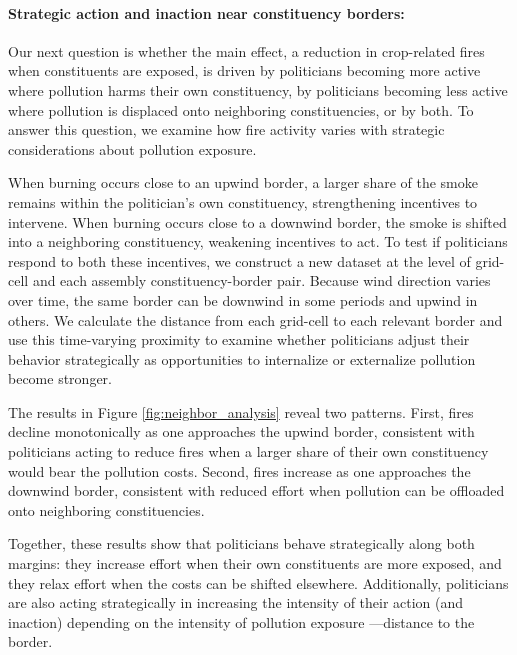 \documentclass[12pt]{article}
\begin{document}
 \paragraph{Strategic action and inaction near constituency borders:}

Our next question is whether the main effect, a reduction in crop-related fires when constituents are exposed, is driven by politicians becoming more active where pollution harms their own constituency, by politicians becoming less active where pollution is displaced onto neighboring constituencies, or by both. To answer this question, we examine how fire activity varies with strategic considerations about pollution exposure.


When burning occurs close to an upwind border, a larger share of the smoke remains within the politician’s own constituency, strengthening incentives to intervene. When burning occurs close to a downwind border, the smoke is shifted into a neighboring constituency, weakening incentives to act.
To test if politicians respond to both these incentives, we construct a new dataset at the level of grid-cell and each assembly constituency-border pair. Because wind direction varies over time, the same border can be downwind in some periods and upwind in others. We calculate the distance from each grid-cell to each relevant border and use this time-varying proximity to examine whether politicians adjust their behavior strategically as opportunities to internalize or externalize pollution become stronger.


The results in Figure \ref{fig:neighbor_analysis} reveal two patterns. First, fires decline monotonically as one approaches the upwind border, consistent with politicians acting to reduce fires when a larger share of their own constituency would bear the pollution costs. Second, fires increase as one approaches the downwind border, consistent with reduced effort when pollution can be offloaded onto neighboring constituencies. 

Together, these results show that politicians behave strategically along both margins: they increase effort when their own constituents are more exposed, and they relax effort when the costs can be shifted elsewhere. Additionally, politicians are also acting strategically in increasing the intensity of their action (and inaction) depending on the intensity of pollution exposure ---distance to the border.
\end{document}
